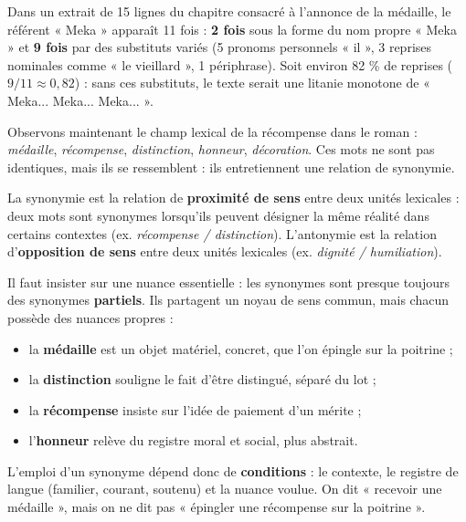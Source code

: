 \documentclass[11pt]{article}
\newcommand{\cle}[1]{{\popxbold\color{popdark}#1}}
\newcounter{popsec}
\newcounter{popsub}
\newcommand{\courssub}[1]{%
  \stepcounter{popsub}%
  \par\vspace{9pt}\noindent{\popxbold\fontsize{11.5}{13}\selectfont\color{popink}{\color{poporange}\thepopsec.\thepopsub}\hspace{6pt}#1}\par\nopagebreak\vspace{4pt}
}
\begin{document}
\begin{exemplebox}
Dans un extrait de 15 lignes du chapitre consacré à l'annonce de la médaille, le référent « Meka » apparaît 11 fois : \textbf{2 fois} sous la forme du nom propre « Meka » et \textbf{9 fois} par des substituts variés (5 pronoms personnels « il », 3 reprises nominales comme « le vieillard », 1 périphrase). Soit environ 82 \% de reprises ($9/11 \approx 0{,}82$) : sans ces substituts, le texte serait une litanie monotone de « Meka... Meka... Meka... ».
\end{exemplebox}

\courssub{La synonymie : la proximité de sens}

Observons maintenant le champ lexical de la récompense dans le roman : \emph{médaille}, \emph{récompense}, \emph{distinction}, \emph{honneur}, \emph{décoration}. Ces mots ne sont pas identiques, mais ils se ressemblent : ils entretiennent une relation de \cle{synonymie}.

\begin{definition}
La \cle{synonymie} est la relation de \textbf{proximité de sens} entre deux unités lexicales : deux mots sont synonymes lorsqu'ils peuvent désigner la même réalité dans certains contextes (ex. \emph{récompense / distinction}). L'\cle{antonymie} est la relation d'\textbf{opposition de sens} entre deux unités lexicales (ex. \emph{dignité / humiliation}).
\end{definition}

Il faut insister sur une nuance essentielle : les synonymes sont presque toujours des synonymes \textbf{partiels}. Ils partagent un noyau de sens commun, mais chacun possède des nuances propres :

\begin{itemize}
\item la \textbf{médaille} est un objet matériel, concret, que l'on épingle sur la poitrine ;
\item la \textbf{distinction} souligne le fait d'être distingué, séparé du lot ;
\item la \textbf{récompense} insiste sur l'idée de paiement d'un mérite ;
\item l'\textbf{honneur} relève du registre moral et social, plus abstrait.
\end{itemize}

L'emploi d'un synonyme dépend donc de \textbf{conditions} : le contexte, le registre de langue (familier, courant, soutenu) et la nuance voulue. On dit « recevoir une médaille », mais on ne dit pas « épingler une récompense sur la poitrine ».
\end{document}
